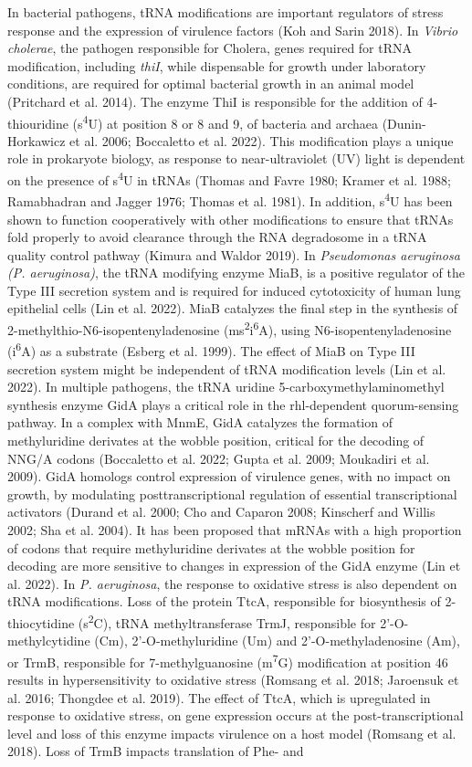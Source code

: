 \documentclass[times, twoside]{zHenriquesLab-StyleBioRxiv}
\begin{document}
In bacterial pathogens, tRNA modifications are important regulators of stress response and the expression of virulence factors (Koh and Sarin 2018). In \textit{Vibrio cholerae}, the pathogen responsible for Cholera, genes required for tRNA modification, including \textit{thiI}, while dispensable for growth under laboratory conditions, are required for optimal bacterial growth in an animal model (Pritchard et al. 2014). The enzyme ThiI is responsible for the addition of 4-thiouridine (s\textsuperscript{4}U) at position 8 or 8 and 9, of bacteria and archaea (Dunin-Horkawicz et al. 2006; Boccaletto et al. 2022). This modification plays a unique role in prokaryote biology, as response to near-ultraviolet (UV) light is dependent on the presence of s\textsuperscript{4}U in tRNAs (Thomas and Favre 1980; Kramer et al. 1988; Ramabhadran and Jagger 1976; Thomas et al. 1981). In addition, s\textsuperscript{4}U has been shown to function cooperatively with other modifications to ensure that tRNAs fold properly to avoid clearance through the RNA degradosome in a tRNA quality control pathway (Kimura and Waldor 2019). In \textit{Pseudomonas aeruginosa (P. aeruginosa)}, the tRNA modifying enzyme MiaB, is a positive regulator of the Type III secretion system and is required for induced cytotoxicity of human lung epithelial cells (Lin et al. 2022). MiaB catalyzes the final step in the synthesis of 2-methylthio-N6-isopentenyladenosine (ms\textsuperscript{2}i\textsuperscript{6}A), using N6-isopentenyladenosine (i\textsuperscript{6}A) as a substrate (Esberg et al. 1999). The effect of MiaB on Type III secretion system might be independent of tRNA modification levels (Lin et al. 2022). In multiple pathogens, the tRNA uridine 5-carboxymethylaminomethyl synthesis enzyme GidA plays a critical role in the rhl-dependent quorum-sensing pathway. In a complex with MnmE, GidA catalyzes the formation of methyluridine derivates at the wobble position, critical for the decoding of NNG/A codons (Boccaletto et al. 2022; Gupta et al. 2009; Moukadiri et al. 2009). GidA homologs control expression of virulence genes, with no impact on growth, by modulating posttranscriptional regulation of essential transcriptional activators (Durand et al. 2000; Cho and Caparon 2008; Kinscherf and Willis 2002; Sha et al. 2004). It has been proposed that mRNAs with a high proportion of codons that require methyluridine derivates at the wobble position for decoding are more sensitive to changes in expression of the GidA enzyme (Lin et al. 2022). In \textit{P. aeruginosa}, the response to oxidative stress is also dependent on tRNA modifications. Loss of the protein TtcA, responsible for biosynthesis of 2-thiocytidine (s\textsuperscript{2}C), tRNA methyltransferase TrmJ, responsible for 2'-O-methylcytidine (Cm), 2'-O-methyluridine (Um) and 2'-O-methyladenosine (Am), or TrmB, responsible for 7-methylguanosine (m\textsuperscript{7}G) modification at position 46 results in hypersensitivity to oxidative stress (Romsang et al. 2018; Jaroensuk et al. 2016; Thongdee et al. 2019). The effect of TtcA, which is upregulated in response to oxidative stress, on gene expression occurs at the post-transcriptional level and loss of this enzyme impacts virulence on a host model (Romsang et al. 2018). Loss of TrmB impacts translation of Phe- and 
\end{document}
